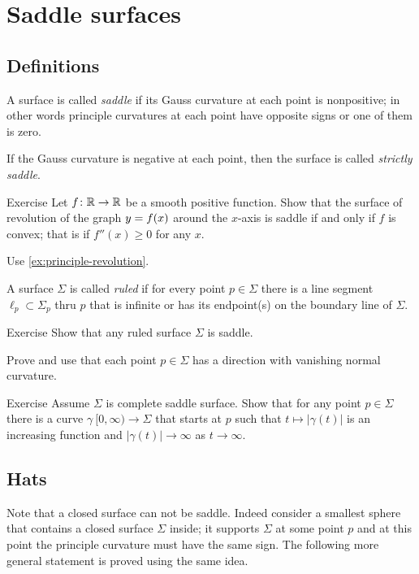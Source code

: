 \chapter{Saddle surfaces}

\section*{Definitions}

A surface is called \emph{saddle} if its Gauss curvature at each point is nonpositive;
in other words principle curvatures at each point have opposite signs or one of them is zero.

If the Gauss curvature is negative at each point,
then the surface is called \emph{strictly saddle}.


\begin{thm}{Exercise}\label{ex:convex-revolution}
Let $f\colon\mathbb{R}\to\mathbb{R}$ be a smooth positive function.
Show that the surface of revolution of the graph $y\z=f(x)$ around the $x$-axis
 is saddle if and only if $f$ is convex; that is if $f''(x)\ge0$ for any $x$.
\end{thm}

 Use \ref{ex:principle-revolution}.

A surface $\Sigma$ is called \emph{ruled} if for every point $p\in \Sigma$ there is a line segment $\ell_p\subset \Sigma_p$ thru $p$ that is infinite or has its endpoint(s) on the boundary line of $\Sigma$.

\begin{thm}{Exercise}
Show that any ruled surface $\Sigma$ is saddle.
\end{thm}

 Prove and use that each point $p\in\Sigma$ has a direction with vanishing normal curvature.

\begin{thm}{Exercise}
Assume $\Sigma$ is complete saddle surface.
Show that for any point $p\in \Sigma$ there is a curve $\gamma\:[0,\infty)\to\Sigma$ that starts at $p$
such that $t\mapsto|\gamma(t)|$ is an increasing function and $|\gamma(t)|\to\infty$ as $t\to\infty$.
\end{thm}


\section*{Hats}

Note that a closed surface can not be saddle.
Indeed consider a smallest sphere that contains a closed surface $\Sigma$ inside;
it supports $\Sigma$ at some point $p$ and at this point the principle curvature must have the same sign.
The following more general statement  is proved using the same idea.

